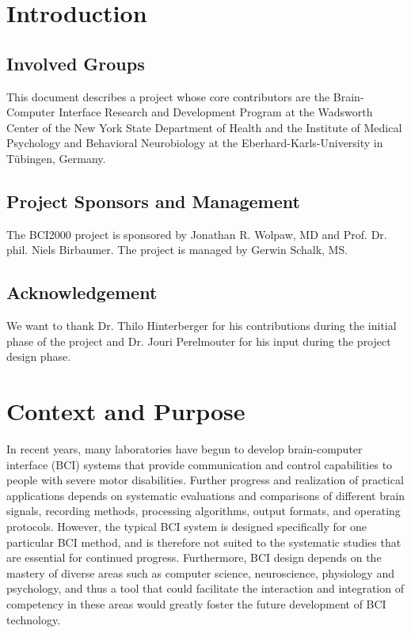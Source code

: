 \documentclass[letterpaper,oneside,12pt]{book}
\begin{document}
\newcommand{\ie}{i.e.}
\newcommand{\eg}{e.g.}

\frontmatter


\tableofcontents

\mainmatter

\chapter{Introduction}

\section{Involved Groups}

This document describes a project whose core contributors are the Brain-Computer 
Interface Research and Development Program at the Wadsworth Center of 
the New York State Department of Health and the Institute of Medical 
Psychology and Behavioral Neurobiology at the Eberhard-Karls-University in
T\"ubingen, Germany.

\section{Project Sponsors and Management}

The BCI2000 project is sponsored by Jonathan R. Wolpaw, MD and Prof. Dr. phil. 
Niels Birbaumer. The project is managed by Gerwin Schalk, MS.

\section{Acknowledgement}

We want to thank Dr. Thilo Hinterberger for his contributions during the initial 
phase of the project and Dr. Jouri Perelmouter for his input during the project 
design phase.


\chapter{Context and Purpose}

In recent years, many laboratories have begun to develop brain-computer 
interface (BCI) systems that provide communication and control capabilities to 
people with severe motor disabilities. Further progress and realization of 
practical applications depends on systematic evaluations and comparisons of 
different brain signals, recording methods, processing algorithms, output 
formats, and operating protocols.  However, the typical BCI system is designed 
specifically for one particular BCI method, and is therefore not suited to the 
systematic studies that are essential for continued progress. Furthermore, BCI 
design depends on the mastery of diverse areas such as computer science, 
neuroscience, physiology and psychology, and thus a tool that could facilitate 
the interaction and integration of competency in these areas would greatly 
foster the future development of BCI technology.
\end{document}
